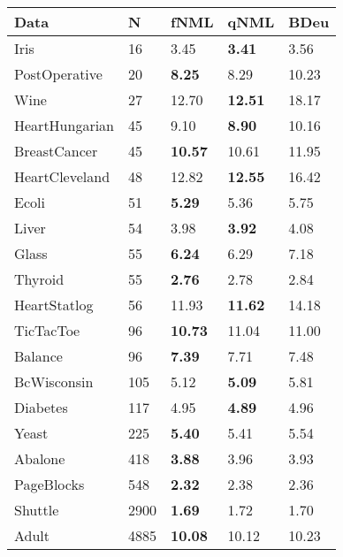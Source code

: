 \begin{tabular}{lllll}
\toprule
           Data &     N &            fNML &            qNML &   BDeu \\
\midrule
           Iris &    16 &            3.45 &   \textbf{3.41} &   3.56 \\
  PostOperative &    20 &   \textbf{8.25} &            8.29 &  10.23 \\
           Wine &    27 &           12.70 &  \textbf{12.51} &  18.17 \\
 HeartHungarian &    45 &            9.10 &   \textbf{8.90} &  10.16 \\
   BreastCancer &    45 &  \textbf{10.57} &           10.61 &  11.95 \\
 HeartCleveland &    48 &           12.82 &  \textbf{12.55} &  16.42 \\
          Ecoli &    51 &   \textbf{5.29} &            5.36 &   5.75 \\
          Liver &    54 &            3.98 &   \textbf{3.92} &   4.08 \\
          Glass &    55 &   \textbf{6.24} &            6.29 &   7.18 \\
        Thyroid &    55 &   \textbf{2.76} &            2.78 &   2.84 \\
   HeartStatlog &    56 &           11.93 &  \textbf{11.62} &  14.18 \\
      TicTacToe &    96 &  \textbf{10.73} &           11.04 &  11.00 \\
        Balance &    96 &   \textbf{7.39} &            7.71 &   7.48 \\
    BcWisconsin &   105 &            5.12 &   \textbf{5.09} &   5.81 \\
       Diabetes &   117 &            4.95 &   \textbf{4.89} &   4.96 \\
          Yeast &   225 &   \textbf{5.40} &            5.41 &   5.54 \\
        Abalone &   418 &   \textbf{3.88} &            3.96 &   3.93 \\
     PageBlocks &   548 &   \textbf{2.32} &            2.38 &   2.36 \\
        Shuttle &  2900 &   \textbf{1.69} &            1.72 &   1.70 \\
          Adult &  4885 &  \textbf{10.08} &           10.12 &  10.23 \\
\bottomrule
\end{tabular}

